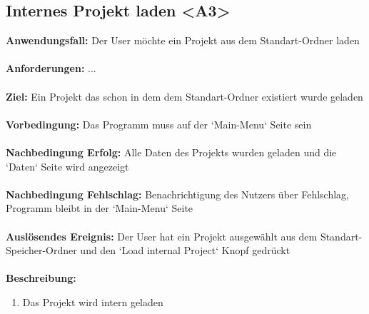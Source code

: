 \documentclass[parskip=full]{scrartcl} %
\begin{document}
\subsection*{Internes Projekt laden <A3>}
\textbf{Anwendungsfall:} Der User möchte ein Projekt aus dem Standart-Ordner laden\\\\
\textbf{Anforderungen:} ...\\\\
\textbf{Ziel:} Ein Projekt das schon in dem dem Standart-Ordner existiert wurde geladen \\\\
\textbf{Vorbedingung:} Das Programm muss auf der `Main-Menu` Seite sein  \\\\
\textbf{Nachbedingung Erfolg:} Alle Daten des Projekts wurden geladen und die `Daten` Seite wird angezeigt \\\\
\textbf{Nachbedingung Fehlschlag:} Benachrichtigung des Nutzers über Fehlschlag, Programm  bleibt in der `Main-Menu` Seite \\\\
\textbf{Auslösendes Ereignis:}  Der User hat ein Projekt ausgewählt aus dem Standart-Speicher-Ordner und den `Load internal Project` Knopf gedrückt \\\\
\textbf{Beschreibung:}
\begin{enumerate}
    \item Das Projekt wird intern geladen
\end{enumerate}
\newpage
\end{document}
